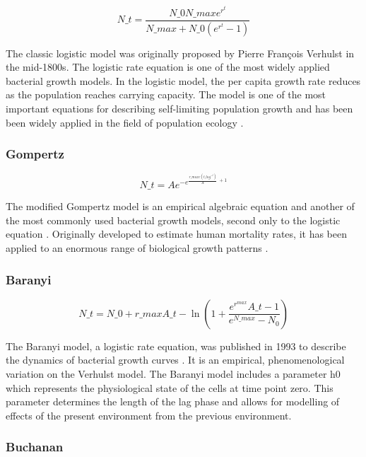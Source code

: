 \documentclass[titlepage]{article}
\begin{document}
    \begin{equation}
    N\_t=\frac{N\_0N\_maxe^{r^{t}}}{N\_max+N\_0(e^{r^{t}}-1)}
  \end{equation}
  
The classic logistic model was originally proposed by  Pierre François Verhulst in the mid-1800s\cite{verhulst1838notice}\cite{peleg2007logistic}. The logistic rate equation is one of the most widely applied bacterial growth models\cite{peleg2011microbial}. In the logistic model, the per capita growth rate reduces as the population reaches carrying capacity. The model is one of the most important equations for describing self-limiting population growth and has been been widely applied in the field of population ecology \cite{kingsland1995modeling}.
\subsubsection{Gompertz}

\begin{equation}
N\_t=Ae ^{-e^{\frac{r\_maxe(t\_lag^{-t})}{A}\ +1}}
\end{equation}

The modified Gompertz model \cite{zwietering1990modeling} is an empirical algebraic equation and another of the most commonly used bacterial growth models, second only to the logistic equation \cite{peleg2011microbial}. Originally developed to estimate human mortality rates, it has been applied to an enormous range of biological growth patterns \cite{tjorve2017use}.
\subsubsection{Baranyi}

\begin{equation}
    N\_t=N\_0+ r\_maxA\_t - \ln(1+ \frac{e^{r^{max}}A\_t - 1}{e^{N\_max} - N_0})
\end{equation}

The Baranyi model, a logistic rate equation, was published in 1993 to describe the dynamics of bacterial growth curves \cite{baranyi1993non}. It is an empirical, phenomenological variation on the Verhulst model. The Baranyi model includes a parameter h0 which represents the physiological state of the cells at time point zero. This parameter determines the length of the lag phase and allows for modelling of effects of the present environment from the previous environment.
\subsubsection{Buchanan}
\end{document}
